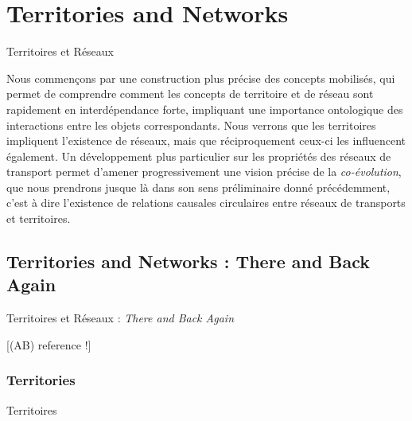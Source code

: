 


\newpage




\section{Territories and Networks}{Territoires et Réseaux}

\label{sec:networkterritories}




Nous commençons par une construction plus précise des concepts mobilisés, qui permet de comprendre comment les concepts de territoire et de réseau sont rapidement en interdépendance forte, impliquant une importance ontologique des interactions entre les objets correspondants. Nous verrons que les territoires impliquent l'existence de réseaux, mais que réciproquement ceux-ci les influencent également. Un développement plus particulier sur les propriétés des réseaux de transport permet d'amener progressivement une vision précise de la \emph{co-évolution}, que nous prendrons jusque là dans son sens préliminaire donné précédemment, c'est à dire l'existence de relations causales circulaires entre réseaux de transports et territoires.


\subsection{Territories and Networks : There and Back Again}{Territoires et Réseaux : \emph{There and Back Again}}

[(AB) reference !]


\subsubsection{Territories}{Territoires}


